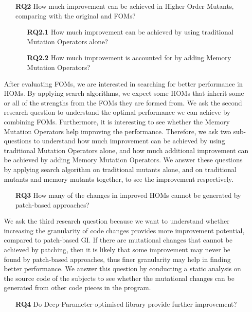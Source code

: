\documentclass[oribibl]{llncs}
\begin{document}
\begin{enumerate}
\item[\textbf{RQ2}] How much improvement can be achieved in Higher Order Mutants, comparing with the original and FOMs?
\begin{enumerate}
\item[\textbf{RQ2.1}] How much improvement can be achieved by using traditional Mutation Operators alone?
\item[\textbf{RQ2.2}] How much improvement is accounted for by adding Memory Mutation Operators?
\end{enumerate}
\end{enumerate}

After evaluating FOMs, we are interested in searching for better performance in HOMs.
By applying search algorithms, we expect some HOMs that inherit some or all of the strengths from the FOMs they are formed from.
We ask the second research question to understand the optimal performance we can achieve by combining FOMs.
Furthermore, it is interesting to see whether the Memory Mutation Operators help improving the performance.
Therefore, we ask two sub-questions to understand how much improvement can be achieved by using traditional Mutation Operators alone, and how much additional improvement can be achieved by adding Memory Mutation Operators.
We answer these questions by applying search algorithm on traditional mutants alone, and on traditional mutants and memory mutants together, to see the improvement respectively.

\begin{enumerate}
\item[\textbf{RQ3}] How many of the changes in improved HOMs cannot be generated by patch-based approaches?
\end{enumerate}

We ask the third research question because we want to understand whether increasing the granularity of code changes provides more improvement potential, compared to patch-based GI.
If there are mutational changes that cannot be achieved by patching, then it is likely that some improvement may never be found by patch-based approaches, thus finer granularity may help in finding better performance.
We answer this question by conducting a static analysis on the source code of the subjects to see whether the mutational changes can be generated from other code pieces in the program.

\begin{enumerate}
\item[\textbf{RQ4}] Do Deep-Parameter-optimised library provide further improvement?
\end{enumerate}
\end{document}
